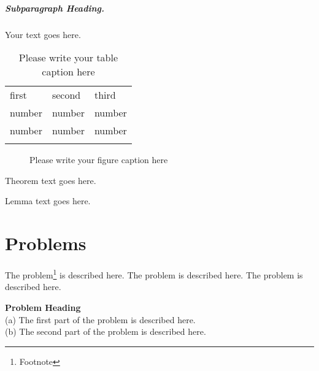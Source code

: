 \documentclass[graybox,envcountchap,sectrefs%
,footinfo
]{svmono}
\begin{document}
\subparagraph{Subparagraph Heading.} Your text goes here.%
%
%
%
\begin{table}
\centering
\caption{Please write your table caption here}
\label{tab:1}       %
%
%
\begin{tabular}{lll}
\hline\noalign{\smallskip}
first & second & third  \\
\noalign{\smallskip}\hline\noalign{\smallskip}
number & number & number \\
number & number & number \\
\noalign{\smallskip}\hline
\end{tabular}
\end{table}
%
%
%
\begin{figure}
\centering
%
%
\caption{Please write your figure caption here}
\label{fig:1}       %
\end{figure}
%
%
\begin{theorem}
Theorem text goes here.
\end{theorem}
%
%
\begin{lemma}
Lemma text goes here.
\end{lemma}
%
%
\section*{Problems}
%
\begin{prob}
\label{prob1}
The problem\footnote{Footnote} is described here. The
problem is described here. The problem is described here.
\end{prob}

\begin{prob}
\label{prob2}
\textbf{Problem Heading}\\
(a) The first part of the problem is described here.\\
(b) The second part of the problem is described here.
\end{prob}
\end{document}
